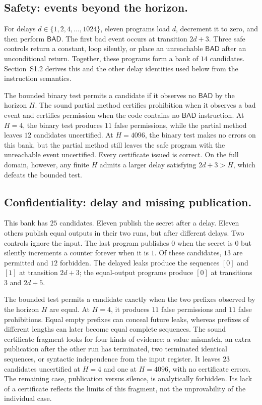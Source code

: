 \documentclass[11pt]{article}
\newcommand{\bad}{\mathsf{BAD}}
\begin{document}
\subsection*{Safety: events beyond the horizon.}
For delays $d\in\{1,2,4,\ldots,1024\}$, eleven programs load $d$, decrement it to zero, and then perform $\bad$. The first bad event occurs at transition $2d+3$. Three safe controls return a constant, loop silently, or place an unreachable $\bad$ after an unconditional return. Together, these programs form a bank of $14$ candidates. Section~S1.2 derives this and the other delay identities used below from the instruction semantics.

The bounded binary test permits a candidate if it observes no $\bad$ by the horizon $H$. The sound partial method certifies prohibition when it observes a bad event and certifies permission when the code contains no $\bad$ instruction. At $H=4$, the binary test produces $11$ false permissions, while the partial method leaves $12$ candidates uncertified. At $H=4096$, the binary test makes no errors on this bank, but the partial method still leaves the safe program with the unreachable event uncertified. Every certificate issued is correct. On the full domain, however, any finite $H$ admits a larger delay satisfying $2d+3>H$, which defeats the bounded test.

\subsection*{Confidentiality: delay and missing publication.}
This bank has $25$ candidates. Eleven publish the secret after a delay. Eleven others publish equal outputs in their two runs, but after different delays. Two controls ignore the input. The last program publishes $0$ when the secret is $0$ but silently increments a counter forever when it is $1$. Of these candidates, $13$ are permitted and $12$ forbidden. The delayed leaks produce the sequences $[0]$ and $[1]$ at transition $2d+3$; the equal-output programs produce $[0]$ at transitions $3$ and $2d+5$.

The bounded test permits a candidate exactly when the two prefixes observed by the horizon $H$ are equal. At $H=4$, it produces $11$ false permissions and $11$ false prohibitions. Equal empty prefixes can conceal future leaks, whereas prefixes of different lengths can later become equal complete sequences. The sound certificate fragment looks for four kinds of evidence: a value mismatch, an extra publication after the other run has terminated, two terminated identical sequences, or syntactic independence from the input register. It leaves $23$ candidates uncertified at $H=4$ and one at $H=4096$, with no certificate errors. The remaining case, publication versus silence, is analytically forbidden. Its lack of a certificate reflects the limits of this fragment, not the unprovability of the individual case.
\end{document}
